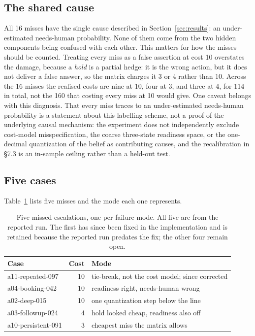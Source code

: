 \documentclass{article}
\begin{document}
\subsection{The shared cause}
All 16 misses have the single cause described in Section~\ref{sec:results}: an
under-estimated needs-human probability. None of them come from the two hidden
components being confused with each other. This matters for how the misses should
be counted. Treating every miss as a false assertion at cost 10 overstates the
damage, because a \emph{hold} is a partial hedge: it is the wrong action, but it
does not deliver a false answer, so the matrix charges it 3 or 4 rather than 10.
Across the 16 misses the realised costs are nine at 10, four at 3, and three at 4,
for 114 in total, not the 160 that costing every miss at 10 would give.
One caveat belongs with this diagnosis. That every miss traces to an
under-estimated needs-human probability is a statement about this labelling
scheme, not a proof of the underlying causal mechanism: the experiment does not
independently exclude cost-model misspecification, the coarse three-state
readiness space, or the one-decimal quantization of the belief as contributing
causes, and the recalibration in §7.3 is an in-sample ceiling rather than a
held-out test.
\subsection{Five cases}
Table~\ref{tab:failures} lists five misses and the mode each one represents.

\begin{table}[t]
\centering
\begin{tabular}{lr p{3.2cm}}
\toprule
Case & Cost & Mode \\
\midrule
a11-repeated-097 & 10 & tie-break, not the cost model; since corrected \\
a04-booking-042 & 10 & readiness right, needs-human wrong \\
a02-deep-015 & 10 & one quantization step below the line \\
a03-followup-024 & 4 & hold looked cheap, readiness also off \\
a10-persistent-091 & 3 & cheapest miss the matrix allows \\
\bottomrule
\end{tabular}
\caption{Five missed escalations, one per failure mode. All five are from the
reported run. The first has since been fixed in the implementation and is retained
because the reported run predates the fix; the other four remain open.}
\label{tab:failures}
\end{table}
\end{document}
